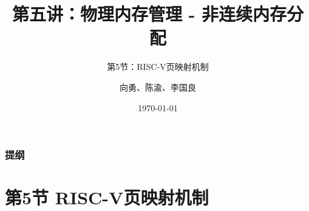 


\title[第5讲]{第五讲：物理内存管理 - 非连续内存分配} %
\subtitle{第5节：RISC-V页映射机制}
\author{向勇、陈渝、李国良} %
\date{\today} %



\begin{frame}
\titlepage %
\end{frame}

\begin{frame}
\frametitle{提纲} %
\tableofcontents %
\end{frame}

\section{第5节 RISC-V页映射机制}%

